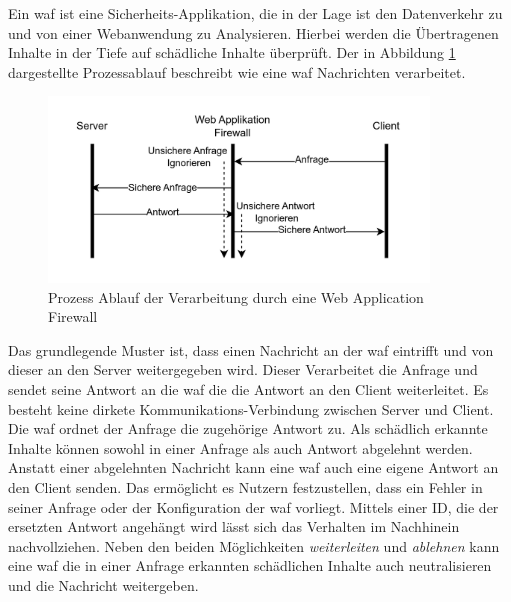 \label{sec:waf-theory}
Ein \ac{waf} ist eine Sicherheits-Applikation, die in der Lage ist den Datenverkehr zu und von einer Webanwendung zu Analysieren.
Hierbei werden die Übertragenen Inhalte in der Tiefe auf schädliche Inhalte überprüft.
Der in Abbildung \ref{fig:waf-porcess-flow} dargestellte Prozessablauf beschreibt wie eine \ac{waf} Nachrichten verarbeitet.

\begin{figure}[!hbt]
    \centering
    \includegraphics[width=0.9\textwidth]{./images/Waf-Process-fliow.png}
    \caption{Prozess Ablauf der Verarbeitung durch eine Web Application Firewall}
    \label{fig:waf-porcess-flow}
\end{figure}

Das grundlegende Muster ist, dass einen Nachricht an der \ac{waf} eintrifft und von dieser an den Server weitergegeben wird.
Dieser Verarbeitet die Anfrage und sendet seine Antwort an die \ac{waf} die die Antwort an den Client weiterleitet.
Es besteht keine dirkete Kommunikations-Verbindung zwischen Server und Client.
Die \ac{waf} ordnet der Anfrage die zugehörige Antwort zu.
Als schädlich erkannte Inhalte können sowohl in einer Anfrage als auch Antwort abgelehnt werden.
Anstatt einer abgelehnten Nachricht kann eine \ac{waf} auch eine eigene Antwort an den Client senden.
Das ermöglicht es Nutzern festzustellen, dass ein Fehler in seiner Anfrage oder der Konfiguration der \ac{waf} vorliegt.
Mittels einer ID, die der ersetzten Antwort angehängt wird lässt sich das Verhalten im Nachhinein nachvollziehen.
Neben den beiden Möglichkeiten \textit{weiterleiten} und \textit{ablehnen} kann eine \ac{waf} die in einer Anfrage erkannten schädlichen Inhalte auch neutralisieren und die Nachricht weitergeben\cite{schmitzGrundlagenWebApplication2018}.\\

